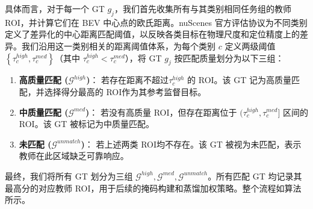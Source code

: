 \documentclass[12pt, UTF8]{ctexart}
\begin{document}
具体而言，对于每一个 GT $g_j$，我们首先收集所有与其类别相同任务组的教师 ROI，并计算它们在 BEV 中心点的欧氏距离。nuScenes 官方评估协议为不同类别定义了差异化的中心距离匹配阈值，以反映各类目标在物理尺度和定位精度上的差异。我们沿用这一类别相关的距离阈值体系，为每个类别 $c$ 定义两级阈值 $\left\{\tau^{high}_c, \tau^{med}_c\right\}$（其中 $\tau^{high}_c < \tau^{med}_c$），将 GT $g_j$ 按匹配质量划分为以下三组：

\begin{enumerate}
    \item[($\mathbf{1}$)] \textbf{高质量匹配 ($\mathcal{G}^{high}$)}：
    若存在距离不超过$\tau^{high}_c$ 的 ROI。该 GT 记为高质量匹配，并选择得分最高的 ROI作为其参考监督目标。

    \item[($\mathbf{2}$)] \textbf{中质量匹配 ($\mathcal{G}^{med}$)}：
    若没有高质量 ROI，但存在距离位于 $(\tau^{high}_c, \tau^{med}_c]$ 区间的 ROI。该 GT 被标记为中质量匹配。

    \item[($\mathbf{3}$)] \textbf{未匹配 ($\mathcal{G}^{unmatch}$)}：
    若上述两类 ROI均不存在。该 GT 被视为未匹配，表示教师在此区域缺乏可靠响应。
\end{enumerate}

最终，我们将所有 GT 划分为三组 $\mathcal{G}^{high}, \mathcal{G}^{med}, \mathcal{G}^{unmatch}$。所有匹配 GT 均记录其最高分的对应教师 ROI，用于后续的掩码构建和蒸馏加权策略。整个流程如算法所示。
\end{document}
